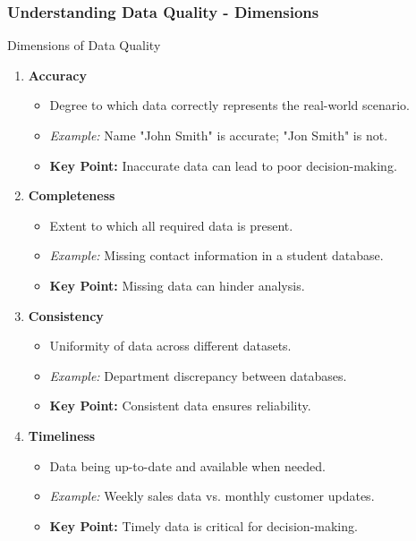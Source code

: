 \documentclass[aspectratio=169]{beamer}
\begin{document}
\begin{frame}[fragile]
    \frametitle{Understanding Data Quality - Dimensions}
    \begin{block}{Dimensions of Data Quality}
        \begin{enumerate}
            \item \textbf{Accuracy} 
            \begin{itemize}
                \item Degree to which data correctly represents the real-world scenario.
                \item \textit{Example:} Name "John Smith" is accurate; "Jon Smith" is not.
                \item \textbf{Key Point:} Inaccurate data can lead to poor decision-making.
            \end{itemize}
            
            \item \textbf{Completeness} 
            \begin{itemize}
                \item Extent to which all required data is present.
                \item \textit{Example:} Missing contact information in a student database.
                \item \textbf{Key Point:} Missing data can hinder analysis.
            \end{itemize}

            \item \textbf{Consistency} 
            \begin{itemize}
                \item Uniformity of data across different datasets.
                \item \textit{Example:} Department discrepancy between databases.
                \item \textbf{Key Point:} Consistent data ensures reliability.
            \end{itemize}

            \item \textbf{Timeliness} 
            \begin{itemize}
                \item Data being up-to-date and available when needed.
                \item \textit{Example:} Weekly sales data vs. monthly customer updates.
                \item \textbf{Key Point:} Timely data is critical for decision-making.
            \end{itemize}
        \end{enumerate}
    \end{block}
\end{frame}
\end{document}
